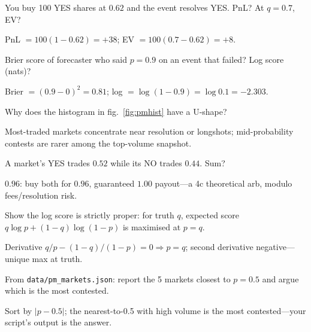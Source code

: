 \begin{exercise}[easy]
You buy 100 YES shares at $0.62$ and the event resolves YES. PnL? At $q=0.7$, EV?
\end{exercise}
\begin{solution}
PnL $=100(1-0.62)=+38$; EV $=100(0.7-0.62)=+8$.
\end{solution}

\begin{exercise}[easy]
Brier score of forecaster who said $p=0.9$ on an event that failed? Log score (nats)?
\end{exercise}
\begin{solution}
Brier $=(0.9-0)^2=0.81$; log $=\log(1-0.9)=\log 0.1=-2.303$.
\end{solution}

\begin{exercise}[easy]
Why does the histogram in fig.\ \ref{fig:pmhist} have a U-shape?
\end{exercise}
\begin{solution}
Most-traded markets concentrate near resolution or longshots; mid-probability contests are
rarer among the top-volume snapshot.
\end{solution}

\begin{exercise}[easy]
A market's YES trades $0.52$ while its NO trades $0.44$. Sum?
\end{exercise}
\begin{solution}
$0.96$: buy both for $0.96$, guaranteed $1.00$ payout---a 4c theoretical arb, modulo
fees/resolution risk.
\end{solution}

\begin{exercise}
Show the log score is strictly proper: for truth $q$, expected score
$q\log p + (1-q)\log(1-p)$ is maximised at $p=q$.
\end{exercise}
\begin{solution}
Derivative $q/p-(1-q)/(1-p)=0\Rightarrow p=q$; second derivative negative---unique max at
truth.
\end{solution}

\begin{exercise}
From \texttt{data/pm\_markets.json}: report the 5 markets closest to $p=0.5$ and argue which
is the most contested.
\end{exercise}
\begin{solution}
Sort by $|p-0.5|$; the nearest-to-0.5 with high volume is the most contested---your script's
output is the answer.
\end{solution}

